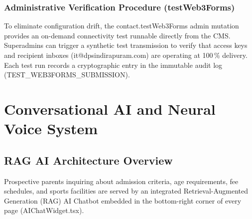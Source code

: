 \documentclass[12pt, a4paper, oneside]{report}
\def\textbf#1{#1}
\def\texttt#1{#1}
\def\&{and}
\begin{document}
\subsection{Administrative Verification Procedure (\texttt{testWeb3Forms})}

To eliminate configuration drift, the \texttt{contact.testWeb3Forms} admin mutation
provides an on-demand connectivity test runnable directly from the CMS.  Superadmins
can trigger a synthetic test transmission to verify that access keys and recipient
inboxes (\texttt{it@dpsindirapuram.com}) are operating at 100\,\% delivery.  Each test
run records a cryptographic entry in the immutable audit log
(\texttt{TEST\_WEB3FORMS\_SUBMISSION}).


\chapter{Conversational AI \texorpdfstring{\&}{and} Neural Voice System}

\section{RAG AI Architecture Overview}

Prospective parents inquiring about admission criteria, age requirements, fee
schedules, and sports facilities are served by an integrated
\textbf{Retrieval-Augmented Generation (RAG) AI Chatbot} embedded in the
bottom-right corner of every page (\texttt{AIChatWidget.tsx}).
\end{document}
